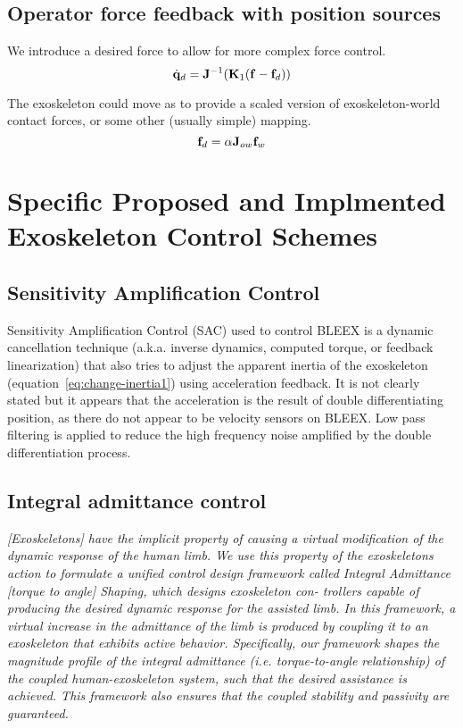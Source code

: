 \documentclass[letterpaper,12pt,fullpage]{article}
\begin{document}
\subsection{Operator force feedback with position sources}

We introduce a desired force to allow for more complex force control.
\begin{equation}
\dot{{\bf q}}_d = {\bf J}^{-1} ({\bf K}_1 ({\bf f} - {\bf f}_d))
\end{equation}

The exoskeleton could move as to provide a scaled version of exoskeleton-world
contact forces, or some other (usually simple) mapping. 
\begin{equation}
{\bf f}_d = \alpha {\bf J}_{ow} {\bf f}_w
\end{equation}

\section{Specific Proposed and Implmented Exoskeleton Control Schemes}

\subsection{Sensitivity Amplification Control}

Sensitivity Amplification Control (SAC) used to control BLEEX
is a dynamic cancellation technique (a.k.a.
inverse dynamics, computed torque, or feedback linearization) that also tries
to adjust the apparent inertia of the exoskeleton (equation~\ref{eq:change-inertia1})
using acceleration feedback. It is not clearly stated but it appears that the
acceleration is the result of double differentiating position, as there do not
appear to be velocity sensors on BLEEX. Low pass filtering is applied to reduce
the high frequency noise amplified by the double differentiation process.

\subsection{Integral admittance control}

{\it [Exoskeletons] have the implicit property
of causing a virtual modification of the dynamic response of
the human limb. We use this property of the exoskeletons
action to formulate a unified control design framework called
Integral Admittance [torque to angle] Shaping, which designs exoskeleton con-
trollers capable of producing the desired dynamic response
for the assisted limb. In this framework, a virtual increase
in the admittance of the limb is produced by coupling it
to an exoskeleton that exhibits active behavior. Specifically,
our framework shapes the magnitude profile of the integral
admittance (i.e. torque-to-angle relationship) of the coupled
human-exoskeleton system, such that the desired assistance is
achieved. This framework also ensures that the coupled stability
and passivity are guaranteed.}~\cite{Nagarajan_etal_2015}
\end{document}
